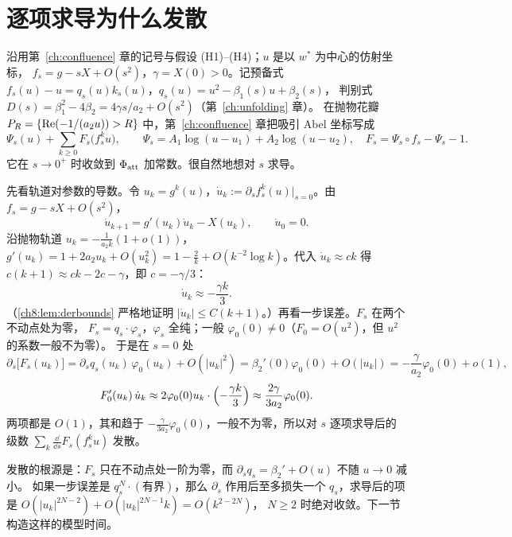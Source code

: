 \section{逐项求导为什么发散}\label{ch8:sec:divergence}

沿用第~\ref{ch:confluence} 章的记号与假设 (H1)--(H4)；$u$ 是以 $w^*$ 为中心的仿射坐标，
$f_s=g-sX+O(s^2)$，$\gamma=X(0)>0$。记预备式 $f_s(u)-u=q_s(u)k_s(u)$，$q_s(u)=u^2-\beta_1(s)u+\beta_2(s)$，
判别式 $D(s)=\beta_1^2-4\beta_2=4\gamma s/a_2+O(s^2)$（第~\ref{ch:unfolding} 章）。
在抛物花瓣 $P_R=\{\operatorname{Re}(-1/(a_2u))>R\}$ 中，第~\ref{ch:confluence} 章把吸引 Abel 坐标写成
\begin{equation}\label{ch8:eq:old-series}
 \Psi_s(u)+\sum_{k\ge0}F_s\bigl(f_s^ku\bigr),\qquad
 \Psi_s=A_1\log(u-u_1)+A_2\log(u-u_2),\quad F_s=\Psi_s\circ f_s-\Psi_s-1 .
\end{equation}
它在 $s\to0^+$ 时收敛到 $\Phi_{\mathrm{att}}$ 加常数。很自然地想对 $s$ 求导。

先看轨道对参数的导数。令 $u_k=g^k(u)$，$\dot u_k:=\partial_sf_s^k(u)|_{s=0}$。由 $f_s=g-sX+O(s^2)$，
\[
 \dot u_{k+1}=g'(u_k)\dot u_k-X(u_k),\qquad \dot u_0=0 .
\]
沿抛物轨道 $u_k=-\frac1{a_2k}(1+o(1))$，$g'(u_k)=1+2a_2u_k+O(u_k^2)=1-\frac2k+O(k^{-2}\log k)$。代入 $\dot u_k\approx ck$
得 $c(k+1)\approx ck-2c-\gamma$，即 $c=-\gamma/3$：
\[
 \dot u_k\approx-\frac{\gamma k}3 .
\]
（\cref{ch8:lem:derbounds} 严格地证明 $|\dot u_k|\le C(k+1)$。）再看一步误差。$F_s$ 在两个不动点处为零，
$F_s=q_s\cdot\varphi_s$，$\varphi_s$ 全纯；一般 $\varphi_0(0)\ne0$（$F_0=O(u^2)$，但 $u^2$ 的系数一般不为零）。
于是在 $s=0$ 处
\[
 \partial_s\bigl[F_s(u_k)\bigr]=\partial_sq_s(u_k)\,\varphi_0(u_k)+O(|u_k|^2)
 =\beta_2'(0)\varphi_0(0)+O(|u_k|)=-\frac{\gamma}{a_2}\varphi_0(0)+o(1),
\]
\[
 F_0'(u_k)\,\dot u_k\approx2\varphi_0(0)u_k\cdot\Bigl(-\frac{\gamma k}3\Bigr)\approx\frac{2\gamma}{3a_2}\varphi_0(0).
\]
两项都是 $O(1)$，其和趋于 $-\frac{\gamma}{3a_2}\varphi_0(0)$，一般不为零，所以对 $s$ 逐项求导后的级数 $\sum_k\frac{\dd}{\dd s}F_s(f_s^ku)$ 发散。

发散的根源是：$F_s$ 只在不动点处一阶为零，而 $\partial_sq_s=\beta_2'+O(u)$ 不随 $u\to0$ 减小。
如果一步误差是 $q_s^N\cdot(\text{有界})$，那么 $\partial_s$ 作用后至多损失一个 $q_s$，求导后的项是 $O(|u_k|^{2N-2})+O(|u_k|^{2N-1}k)=O(k^{2-2N})$，
$N\ge2$ 时绝对收敛。下一节构造这样的模型时间。


